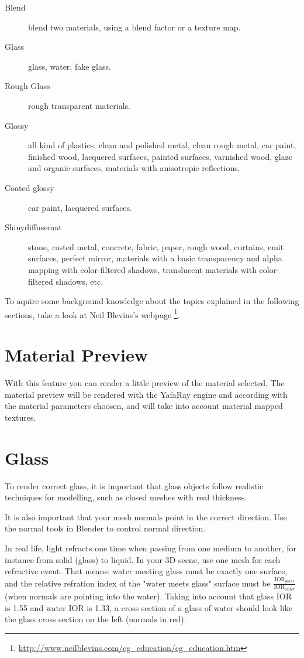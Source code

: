 \begin{description}
\item[Blend] blend two materials, using a blend factor or a texture map.
\item[Glass] glass, water, fake glass.
\item[Rough Glass] rough transparent materials.
\item[Glossy] all kind of plastics, clean and polished metal, clean rough metal, car paint, finished wood, lacquered surfaces, painted surfaces, varnished wood, glaze and organic surfaces, materials with anisotropic reflections.
\item[Coated glossy] car paint, lacquered surfaces.
\item[Shinydiffusemat] stone, rusted metal, concrete, fabric, paper, rough wood, curtains, emit surfaces, perfect mirror, materials with a basic transparency and alpha mapping with color-filtered shadows, translucent materials with color-filtered shadows, etc.
\end{description}

To aquire some background knowledge about the topics explained in the following sections, take a look at Neil Blevins's webpage \footnote{\url{http://www.neilblevins.com/cg_education/cg_education.htm}}.

\section{Material Preview}

With this feature you can render a little preview of the material selected. The material preview will be rendered with the YafaRay engine and according with the material parameters choosen, and will take into account material mapped textures.

\section{Glass}

To render correct glass, it is important that glass objects follow realistic techniques for modelling, such as closed meshes with real thickness.

It is also important that your mesh normals point in the correct direction. Use the normal tools in Blender to control normal direction.

In real life, light refracts one time when passing from one medium to another, for instance from solid (glass) to liquid. In your 3D scene, use one mesh for each refractive event. That means: water meeting glass must be exactly one surface, and the relative refration index of the "water meets glass" surface must be $\frac{\text{IOR}_{glass}}{\text{IOR}_{water}}$ (when normals are pointing into the water). Taking into account that glass IOR is 1.55 and water IOR is 1.33, a cross section of a glass of water should look like the glass cross section on the left (normals in red).

